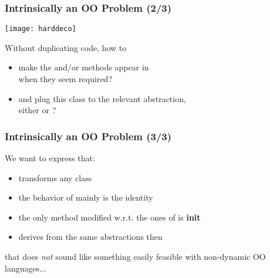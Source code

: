 \begin{frame}
  \frametitle{Intrinsically an OO Problem (2/3)}

\hspace*{-7mm}
\texttt{[image: harddeco]}

\smallskip

{\scriptsize
Without duplicating code, how to
  \begin{itemize}
  \item make the \bfprev and/or \bfnext methods appear in \bfhelloiterator \\
    when they seem required?
  \item and plug this class to the relevant abstraction,\\
    either \bfBackwardIterator or \bfForwardIterator?
\end{itemize}
}

\end{frame}



\begin{frame}
  \frametitle{Intrinsically an OO Problem (3/3)}

We want to express that:
\smallskip
%

\begin{itemize}
\item \bfhelloiterator transforms any \bfIterator class
\smallskip
%

\item the behavior of \bfhelloiterator mainly is the identity
\smallskip
%

\item the only method modified w.r.t. the ones of \bfI is \textbf{init}
\smallskip
%

\item \bfhelloiteratorI derives from the same
  abstractions then \bfI \smallskip
%
\end{itemize}

%
\bigskip
%

that does \textit{not} sound like something easily feasible with non-dynamic OO languages...

\end{frame}



